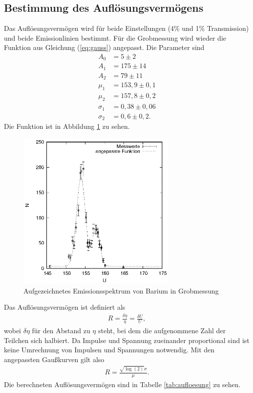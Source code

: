 \subsection{Bestimmung des Auflösungsvermögens}
Das Auflösungsvermögen wird für beide Einstellungen (4\% und 1\% Transmission) und beide Emissionlinien bestimmt. Für die Grobmessung wird wieder die Funktion aus Gleichung (\ref{eq:gauss}) angepasst. Die Parameter sind
\begin{align*}
  A_0&=5\pm 2\\
  A_1&=175\pm 14\\
  A_2&=79\pm 11\\
  \mu_1&=153,9 \pm 0,1\\
  \mu_2&=157,8 \pm 0,2\\
  \sigma_1&=0,38 \pm 0,06\\
  \sigma_2&=0,6 \pm 0,2.
\end{align*}
Die Funktion ist in Abbildung \ref{fig:ba_grob} zu sehen.
\begin{figure}[h]
  \centering
  \includegraphics[width=0.7\textwidth]{data/Ba_grob.eps}
  \caption{Aufgezeichnetes Emissionsspektrum von Barium in Grobmessung}
  \label{fig:ba_grob}
\end{figure}

Das Auflösungsvermögen ist definiert als
\begin{align*}
  R=\frac{\delta\eta}{\eta}=\frac{\delta U}{U},
\end{align*}
wobei $\delta\eta$ für den Abstand zu $\eta$ steht, bei dem die aufgenommene Zahl der Teilchen sich halbiert. Da Impulse und Spannung zueinander proportional sind ist keine Umrechnung von Impulsen und Spannungen notwendig. Mit den angepassten Gaußkurven gilt also 
\begin{align*}
  R=\frac{\sqrt{\log(2)} \sigma}{\mu}.
\end{align*}
Die berechneten Auflösungsvermögen sind in Tabelle \ref{tab:aufloesung} zu sehen.

